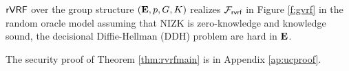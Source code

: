 \begin{theorem}\label{thm:rvrfmain}
$ {\mathsf{rVRF}} $  over the group structure $ ({\mathbf{E}},p,G,K) $ realizes $ \mathcal{F}_{\textsf{rvrf}} $ in Figure \ref{f:gvrf} in the random oracle model assuming that NIZK is zero-knowledge and knowledge sound, the decisional Diffie-Hellman (DDH) problem are hard in $ {\mathbf{E}}  $. 
\end{theorem}
The security proof of Theorem \ref{thm:rvrfmain} is in Appendix \ref{ap:ucproof}.





\endinput





TODO:  Eprint form?

\begin{itemize}
\item $\rVRF.\rSign : (\sk,\openring,\msg,\aux) \mapsto \sigma$ takes
 a secret key \sk, a ring opening \openring, a message \msg, and \aux, and then %
 generates \openpk, computes a ring membership proof $\piring$
  $$ \piring = \NIZK \Setst{ \compk, \comring }{
  \exists \openpk,\openring \textrm{\ s.t.\ } 
  \genfrac{}{}{0pt}{}{\PedVRF.\OpenKey(\compk,\openpk) \quad}{\,\, = \rVRF.\OpenKey(\comring,\openring)}
  } $$
 computes the signature
  $$ \sigma = \PedVRF.\Sign(\sk,\openpk,\msg,\aux \doubleplus \compk \doubleplus \piring \doubleplus \comring), \quad\textrm{and} $$ %
 returns the ring VRF signature $\rho = (\compk,\piring,\sigma)$.
\item $\rVRF.\rVerify$ takes $(\comring,\msg,\aux,\rho)$,
 parses $\rho$ as $(\compk,\piring,\sigma,)$,  and then returns
 $$ \PedVRF.\Verify(\compk,\msg,\aux \doubleplus \compk \doubleplus \piring \doubleplus \comring,\sigma) $$
 iff $\NIZK.\Verify(\piring,\compk,\comring)$ succeeds. 
\end{itemize}























